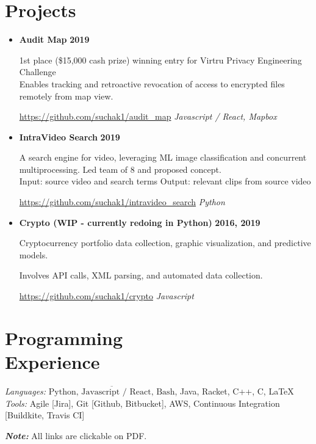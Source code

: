 \documentclass[margin]{resume}
\begin{document}
    \section{\mysidestyle Projects}
    \begin{itemize}
\item \textcolor{blu}{\textbf{Audit Map}} \hfill \textbf{2019}

1st place (\$15,000 cash prize) winning entry for Virtru Privacy Engineering Challenge \\ 
Enables tracking and retroactive revocation of access to encrypted files remotely from map view. 

\url{https://github.com/suchak1/audit_map} \hfill \textit{Javascript / React, Mapbox}

\item \textbf{IntraVideo Search} \hfill \textbf{2019}

A search engine for video, leveraging ML image classification and concurrent multiprocessing. Led team of 8 and proposed concept.\\ Input: source video and search terms \hfill Output: relevant clips from source video

\url{https://github.com/suchak1/intravideo_search} \hfill \textit{Python}

\item \textbf{Crypto (WIP - currently redoing in Python)} \hfill \textbf{2016, 2019}

Cryptocurrency portfolio data collection, graphic visualization, and predictive models.

Involves API calls, XML parsing, and automated data collection.

\url{https://github.com/suchak1/crypto} \hfill \textit{Javascript}

    \end{itemize}
        \section{\mysidestyle Programming\\Experience}

    \emph{Languages:} $\overline{\mbox{Python, Javascript / React, Bash}}$, Java, Racket, C++, C, \LaTeX \\
    \emph{Tools:} Agile [Jira], Git [Github, Bitbucket], AWS, Continuous Integration [Buildkite, Travis CI]
    
\textbf {\textit {Note:}} All links are clickable on PDF.
    
\end{document}
